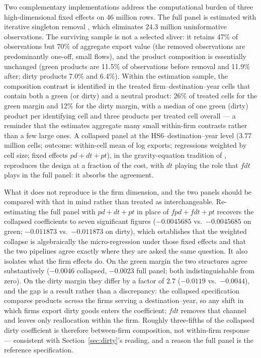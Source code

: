 \documentclass[12pt]{article}
\begin{document}
Two complementary implementations address the computational burden of three
high-dimensional fixed effects on 46 million rows. The full panel is estimated with
iterative singleton removal \citep{correia2017}, which eliminates 24.3 million
uninformative observations. The surviving sample is not a selected sliver: it retains
47\% of observations but 70\% of aggregate export value (the removed observations are
predominantly one-off, small flows), and the product composition is essentially
unchanged (green products are 11.5\% of observations before removal and 11.9\% after;
dirty products 7.0\% and 6.4\%). Within the estimation sample, the composition contrast
is identified in the treated firm--destination--year cells that contain both a green
(or dirty) and a neutral product: 26\% of treated cells for the green margin and 12\%
for the dirty margin, with a median of one green (dirty) product per identifying cell
and three products per treated cell overall --- a reminder that the estimates aggregate
many small within-firm contrasts rather than a few large ones. A collapsed panel at the HS6--destination--year level (3.77
million cells; outcome: within-cell mean of log exports; regressions weighted by cell
size; fixed effects $pd+dt+pt$), in the gravity-equation tradition of
\citet{headmayer2014}, reproduces the design at a fraction of the cost, with $dt$ playing
the role that $fdt$ plays in the full panel: it absorbs the agreement.

What it does not reproduce is the firm dimension, and the two panels should be compared
with that in mind rather than treated as interchangeable. Re-estimating the full panel
with $pd+dt+pt$ in place of $fpd+fdt+pt$ recovers the collapsed coefficients to seven
significant figures ($-0.0045685$ vs.\ $-0.0045685$ on green; $-0.011873$ vs.\
$-0.011873$ on dirty), which establishes that the weighted collapse is algebraically the
micro-regression under those fixed effects and that the two pipelines agree exactly where
they are asked the same question. It also isolates what the firm effects do. On the green
margin the two structures agree substantively ($-0.0046$ collapsed, $-0.0023$ full panel;
both indistinguishable from zero). On the dirty margin they differ by a factor of
$2.7$ ($-0.0119$ vs.\ $-0.0044$), and the gap is a result rather than a discrepancy: the
collapsed specification compares products \emph{across} the firms serving a
destination--year, so any shift in which firms export dirty goods enters the coefficient;
$fdt$ removes that channel and leaves only reallocation within the firm. Roughly
three-fifths of the collapsed dirty coefficient is therefore between-firm composition, not
within-firm response --- consistent with Section~\ref{sec:dirty}'s reading, and a reason
the full panel is the reference specification.
\end{document}
